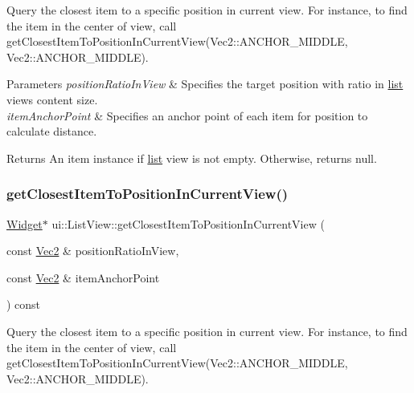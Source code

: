 Query the closest item to a specific position in current view. For instance, to find the item in the center of view, call \textquotesingle{}get\+Closest\+Item\+To\+Position\+In\+Current\+View(\+Vec2\+::\+A\+N\+C\+H\+O\+R\+\_\+\+M\+I\+D\+D\+L\+E, Vec2\+::\+A\+N\+C\+H\+O\+R\+\_\+\+M\+I\+D\+D\+L\+E)\textquotesingle{}. 


\begin{DoxyParams}{Parameters}
{\em position\+Ratio\+In\+View} & Specifies the target position with ratio in \hyperlink{protocollist-p}{list} view\textquotesingle{}s content size. \\
\hline
{\em item\+Anchor\+Point} & Specifies an anchor point of each item for position to calculate distance. \\
\hline
\end{DoxyParams}
\begin{DoxyReturn}{Returns}
An item instance if \hyperlink{protocollist-p}{list} view is not empty. Otherwise, returns null. 
\end{DoxyReturn}
\mbox{\label{classui_1_1ListView_ab96d0803fe3fde3d5691631b6c3d9803}} 
\subsubsection{\texorpdfstring{get\+Closest\+Item\+To\+Position\+In\+Current\+View()}{getClosestItemToPositionInCurrentView()}\hspace{0.1cm}{\footnotesize\ttfamily [2/2]}}
{\footnotesize\ttfamily \hyperlink{classui_1_1Widget}{Widget}$\ast$ ui\+::\+List\+View\+::get\+Closest\+Item\+To\+Position\+In\+Current\+View (\begin{DoxyParamCaption}\item[{const \hyperlink{classVec2}{Vec2} \&}]{position\+Ratio\+In\+View,  }\item[{const \hyperlink{classVec2}{Vec2} \&}]{item\+Anchor\+Point }\end{DoxyParamCaption}) const}



Query the closest item to a specific position in current view. For instance, to find the item in the center of view, call \textquotesingle{}get\+Closest\+Item\+To\+Position\+In\+Current\+View(\+Vec2\+::\+A\+N\+C\+H\+O\+R\+\_\+\+M\+I\+D\+D\+L\+E, Vec2\+::\+A\+N\+C\+H\+O\+R\+\_\+\+M\+I\+D\+D\+L\+E)\textquotesingle{}. 


